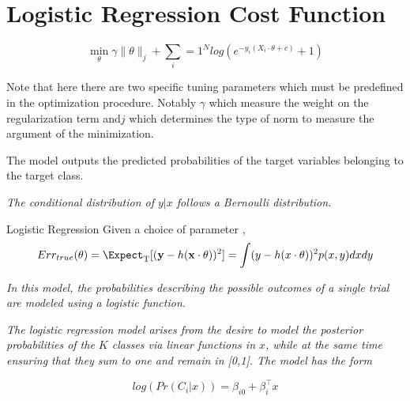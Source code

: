 \section{Logistic Regression Cost Function}

\begin{equation} \label{logit}
 \min_{\theta} \gamma\| \theta\|_{j}  + \sum_i=1^N log(e^{-y_i (X_i \cdot \theta + c )} +1) 
\end{equation}

Note that here there are two specific tuning parameters which must be predefined in the optimization procedure. Notably $\gamma$ which measure the weight on the regularization term and$j$ which determines the type of norm to measure the argument of the minimization.

The model outputs the predicted probabilities of the target variables belonging to the target class.

\textit{The conditional distribution of $y|x$ follows a Bernoulli distribution.}


\begin{definition}{Logistic Regression}
Given a choice of parameter \theta,
\[
    Err_{true}(\theta)  = \Expect_{ \mathrm{T}}[(\textbf{y} - h(\textbf{x} \cdot \theta) )^2] \\
    = \int (y - h(x \cdot \theta) )^2 p(x,y)dxdy
\]
\end{definition}

\textit{In this model, the probabilities describing the possible outcomes of a single trial are modeled using a logistic function.}

\textit{The logistic regression model arises from the desire to model the posterior probabilities of the $K$ classes via linear functions in $x$, while at the same time ensuring that they sum to one and remain in [0,1]. The model has the form }


$$ log(Pr(C_i|x)) = \beta_{i0}  + \beta_i^\intercal x  $$


\textit{}
\textit{}
\textit{}